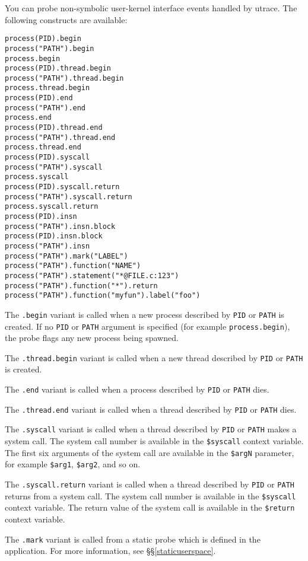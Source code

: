 \documentclass[twoside,english]{article}
\newenvironment{vindent}
{\begin{list}{}{\setlength{\listparindent}{6pt}}
\item[]}
{\end{list}}
\begin{document}
You can probe non-symbolic user-kernel interface events handled by
utrace. The following constructs are available:
\begin{vindent}
\begin{verbatim}
process(PID).begin
process("PATH").begin
process.begin
process(PID).thread.begin
process("PATH").thread.begin
process.thread.begin
process(PID).end
process("PATH").end
process.end
process(PID).thread.end
process("PATH").thread.end
process.thread.end
process(PID).syscall
process("PATH").syscall
process.syscall
process(PID).syscall.return
process("PATH").syscall.return
process.syscall.return
process(PID).insn
process("PATH").insn.block
process(PID).insn.block
process("PATH").insn
process("PATH").mark("LABEL")
process("PATH").function("NAME")
process("PATH").statement("*@FILE.c:123")
process("PATH").function("*").return
process("PATH").function("myfun").label("foo")
\end{verbatim}
\end{vindent}

The \texttt{.begin} variant is called when a new process described by
\texttt{PID} or \texttt{PATH} is created. If no \texttt{PID} or
\texttt{PATH} argument is specified (for example
\texttt{process.begin}), the probe flags any new process being
spawned.

The \texttt{.thread.begin} variant is called when a new thread
described by \texttt{PID} or \texttt{PATH} is created.

The \texttt{.end} variant is called when a process described by
\texttt{PID} or \texttt{PATH} dies.

The \texttt{.thread.end} variant is called when a thread described by
\texttt{PID} or \texttt{PATH} dies.

The \texttt{.syscall} variant is called when a thread described by
\texttt{PID} or \texttt{PATH} makes a system call.  The system call
number is available in the \texttt{\$syscall} context variable.  The
first six arguments of the system call are available in the
\texttt{\$argN} parameter, for example \texttt{\$arg1},
\texttt{\$arg2}, and so on.

The \texttt{.syscall.return} variant is called when a thread described
by \texttt{PID} or \texttt{PATH} returns from a system call.  The
system call number is available in the \texttt{\$syscall} context
variable.  The return value of the system call is available in the
\texttt{\$return} context variable.

The \texttt{.mark} variant is called from a static probe which is
defined in the application. For more information, see
\S\S\ref{staticuserspace}.
\end{document}
